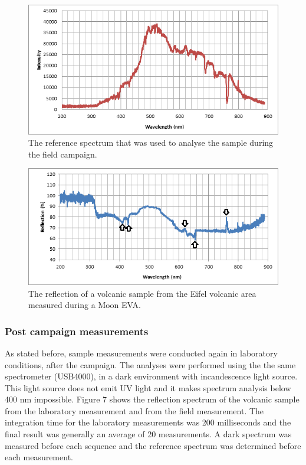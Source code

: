 \documentclass[preprint]{elsarticle}
\begin{document}
\begin{figure}
\centering
\includegraphics{img/figure05.png}
\caption{The reference spectrum that was used to analyse the sample during the field campaign.}
\label{fig:f05}
\end{figure}

\begin{figure}
\centering
\includegraphics{img/figure06.png}
\caption{The reflection of a volcanic sample from the Eifel volcanic area measured during a Moon EVA.}
\label{fig:f06}
\end{figure}

\subsubsection{Post campaign measurements}
As stated before, sample measurements were conducted again in laboratory conditions, after the campaign. The analyses were performed using the the same spectrometer (USB4000), in a dark environment with incandescence light source. This light source does not emit UV light and it makes spectrum analysis below 400 nm impossible. Figure 7 shows the reflection spectrum of the volcanic sample from the laboratory measurement and from the field measurement. The integration time for the laboratory measurements was 200 milliseconds and the final result was generally an average of 20 measurements. A dark spectrum was measured before each sequence and the reference spectrum was determined before each measurement.
\end{document}
